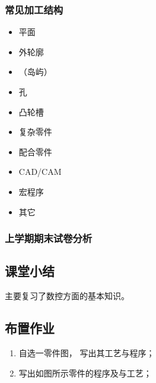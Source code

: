 \subsubsection{常见加工结构}
\begin{itemize}
	\item 平面

	\item 外轮廓

	\item （岛屿）

	\item 孔
	\item 凸轮槽

	\item 复杂零件

	\item 配合零件

	\item CAD/CAM

	\item 宏程序

	\item 其它
\end{itemize}
\subsubsection{上学期期末试卷分析}
\subsection{课堂小结}
主要复习了数控方面的基本知识。
\vfill
\subsection{布置作业}
\begin{enumerate}[1、]
	\item 自选一零件图， 写出其工艺与程序；

	\item 写出如图所示零件的程序及与工艺；
\end{enumerate}

